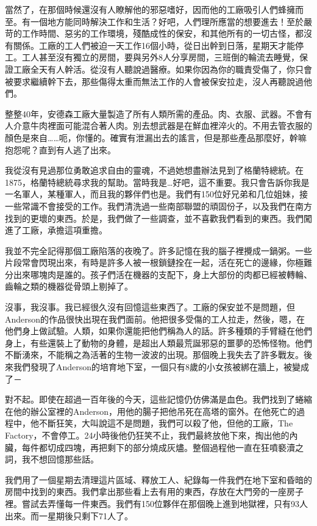 當然了，在那個時候還沒有人瞭解他的邪惡嗜好，因而他的工廠吸引人們蜂擁而至。有一個地方能同時解決工作和生活？好吧，人們理所應當的想要進去！至於嚴苛的工作時間、惡劣的工作環境，殘酷成性的保安，和其他所有的一切古怪，都沒有關係。工廠的工人們被迫一天工作16個小時，從日出幹到日落，星期天才能停工。工人甚至沒有獨立的房間，要與另外8人分享房間，三班倒的輪流去睡覺，保證工廠全天有人幹活。從沒有人聽說過醫療。如果你因為你的職責受傷了，你只會被要求繼續幹下去，那些傷得太重而無法工作的人會被保安拉走，沒人再聽說過他們。

整整40年，安德森工廠大量製造了所有人類所需的產品。肉、衣服、武器。不會有人介意牛肉裡面可能混合著人肉。別去想武器是在鮮血裡淬火的。不用去管衣服的顏色是來自……呃，你懂的。確實有泄漏出去的謠言，但是那些產品那麼好，幹嘛抱怨呢？直到有人逃了出來。

我從沒有見過那位勇敢追求自由的靈魂，不過她想盡辦法見到了格蘭特總統。在1875，格蘭特總統尋求我的幫助。當時我是…好吧，這不重要。我只會告訴你我是一名軍人，某種軍人，而且我的夥伴們也是。我們有150位好兄弟和几位姐妹，接一些常識不會接受的工作。我們清洗過一些南部聯盟的頑固份子，以及我們在南方找到的更壞的東西。於是，我們做了一些調查，並不喜歡我們看到的東西。我們闖進了工廠，承擔這項重擔。

我並不完全記得那個工廠陷落的夜晚了。許多記憶在我的腦子裡攪成一鍋粥。一些片段常會閃現出來，有時是許多人被一根鎖鏈拴在一起，活在死亡的邊緣，你極難分出來哪塊肉是誰的。孩子們活在機器的支配下，身上大部份的肉都已經被轉輪、齒輪之類的機器從骨頭上剔掉了。

沒事，我沒事。我已經很久沒有回憶這些東西了。工廠的保安並不是問題，但Anderson的作品很快出現在我們面前。他把很多受傷的工人拉走，然後，嗯，在他們身上做試驗。人類，如果你還能把他們稱為人的話。許多種類的手臂縫在他們身上，有些還裝上了動物的身體，是超出人類最荒誕邪惡的噩夢的恐怖怪物。他們不斷湧來，不能稱之為活著的生物一波波的出現。那個晚上我失去了許多戰友。後來我們發現了Anderson的培育地下室，一個只有8歲的小女孩被綁在牆上，被變成了－

對不起。即使在超過一百年後的今天，這些記憶仍仿佛滿是血色。我們找到了蜷縮在他的辦公室裡的Anderson，用他的腸子把他吊死在高塔的窗外。在他死亡的過程中，他不斷狂笑，大叫說這不是問題，我們可以殺了他，但他的工廠，The Factory，不會停工。24小時後他仍狂笑不止，我們最終放他下來，掏出他的內臟，每件都切成四塊，再把剩下的部分燒成灰燼。整個過程他一直在狂噴褻瀆之詞，我不想回憶那些話。

我們用了一個星期去清理這片區域、釋放工人、紀錄每一件我們在地下室和昏暗的房間中找到的東西。我們拿出那些看上去有用的東西，存放在大門旁的一座房子裡。嘗試去弄懂每一件東西。我們有150位夥伴在那個晚上進到地獄裡，只有93人出來。而一星期後只剩下71人了。

